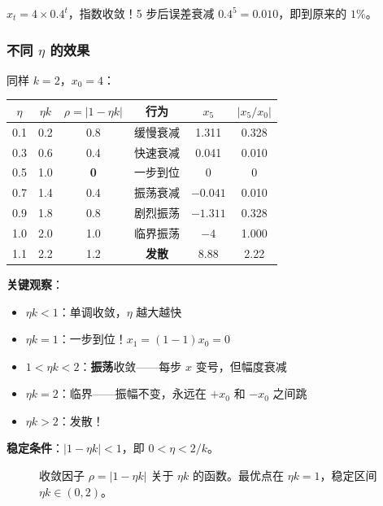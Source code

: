 \documentclass[12pt, a4paper]{ctexart}
\begin{document}
$x_t = 4 \times 0.4^t$，指数收敛！5 步后误差衰减 $0.4^5 = 0.010$，即到原来的 $1\%$。

\subsubsection{不同 $\eta$ 的效果}

同样 $k = 2$，$x_0 = 4$：

\begin{center}
\begin{tabular}{c|ccccc}
$\eta$ & $\eta k$ & $\rho = |1-\eta k|$ & 行为 & $x_5$ & $|x_5/x_0|$ \\
\hline
0.1 & 0.2 & 0.8 & 缓慢衰减 & 1.311 & 0.328 \\
0.3 & 0.6 & 0.4 & 快速衰减 & 0.041 & 0.010 \\
0.5 & 1.0 & \textbf{0} & 一步到位 & 0 & 0 \\
0.7 & 1.4 & 0.4 & 振荡衰减 & $-0.041$ & 0.010 \\
0.9 & 1.8 & 0.8 & 剧烈振荡 & $-1.311$ & 0.328 \\
1.0 & 2.0 & 1.0 & 临界振荡 & $-4$ & 1.000 \\
1.1 & 2.2 & 1.2 & \textbf{发散} & 8.88 & 2.22 \\
\end{tabular}
\end{center}

\textbf{关键观察}：
\begin{itemize}
    \item $\eta k < 1$：单调收敛，$\eta$ 越大越快
    \item $\eta k = 1$：一步到位！$x_1 = (1-1)x_0 = 0$
    \item $1 < \eta k < 2$：\textbf{振荡}收敛——每步 $x$ 变号，但幅度衰减
    \item $\eta k = 2$：临界——振幅不变，永远在 $+x_0$ 和 $-x_0$ 之间跳
    \item $\eta k > 2$：发散！
\end{itemize}

\textbf{稳定条件}：$|1 - \eta k| < 1$，即 $0 < \eta < 2/k$。

\begin{figure}[ht]
\centering
{}
\caption{收敛因子 $\rho = |1 - \eta k|$ 关于 $\eta k$ 的函数。最优点在 $\eta k = 1$，稳定区间 $\eta k \in (0, 2)$。}
\end{figure}
\end{document}
